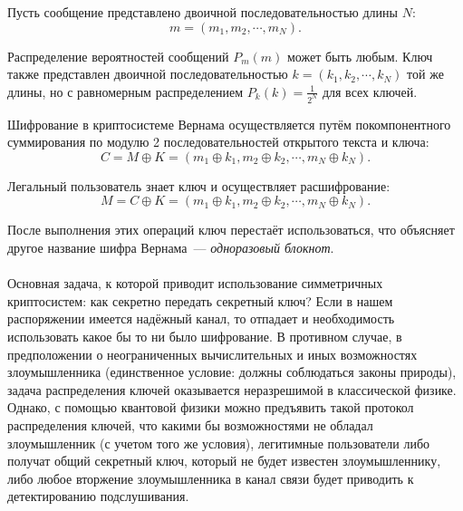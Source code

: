 Пусть сообщение представлено двоичной последовательностью длины $N$:
\begin{equation}
   m = (m_1, m_2, \cdots, m_N).
\end{equation}

Распределение вероятностей сообщений $P_m(m)$ может быть любым. Ключ также представлен двоичной последовательностью $k =
(k_1, k_2, \cdots, k_N )$ той же длины, но с равномерным распределением $P_k(k) = \frac{1}{2^N}$
для всех ключей.

Шифрование в криптосистеме Вернама осуществляется путём покомпонентного суммирования по модулю 2 последовательностей открытого текста и ключа:
\begin{equation}
  C = M \oplus K = (m_1 \oplus k_1, m_2 \oplus k_2, \cdots, m_N \oplus k_N ).
\end{equation}

Легальный пользователь знает ключ и осуществляет расшифрование:
\begin{equation}
 M = C \oplus K = (m_1 \oplus k_1, m_2 \oplus k_2, \cdots, m_N \oplus k_N ). 
\end{equation}

После выполнения этих операций ключ перестаёт использоваться, что объясняет другое название шифра Вернама~--- \textit{одноразовый блокнот}. 

\paragraph*{}
Основная задача, к которой приводит использование симметричных криптосистем: как секретно передать секретный ключ?
Если в нашем распоряжении имеется надёжный канал, то отпадает и необходимость использовать какое бы то ни было шифрование.
В противном случае, в предположении о неограниченных вычислительных и иных возможностях злоумышленника (единственное условие: должны соблюдаться законы природы),
задача распределения ключей оказывается неразрешимой в классической физике. Однако, с помощью квантовой физики можно предъявить такой протокол распределения ключей, 
что какими бы возможностями не обладал злоумышленник (с учетом того же условия), легитимные пользователи либо получат общий секретный ключ, который не будет известен злоумышленнику,
либо любое вторжение злоумышленника в канал связи будет приводить к детектированию подслушивания.